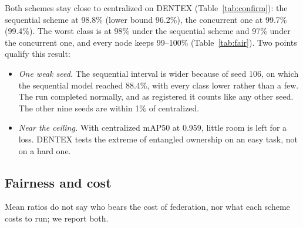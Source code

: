 \documentclass[pdflatex,sn-mathphys-num]{sn-jnl}
\begin{document}
Both schemes stay close to centralized on DENTEX (Table~\ref{tab:confirm}): the sequential scheme at 98.8\% (lower bound 96.2\%), the concurrent one at 99.7\% (99.4\%). The worst class is at 98\% under the sequential scheme and 97\% under the concurrent one, and every node keeps 99--100\% (Table~\ref{tab:fair}). Two points qualify this result:
\begin{itemize}
\item \emph{One weak seed.} The sequential interval is wider because of seed 106, on which the sequential model reached 88.4\%, with every class lower rather than a few. The run completed normally, and as registered it counts like any other seed. The other nine seeds are within 1\% of centralized.
\item \emph{Near the ceiling.} With centralized mAP50 at 0.959, little room is left for a loss. DENTEX tests the extreme of entangled ownership on an easy task, not on a hard one.
\end{itemize}

\subsection{Fairness and cost}\label{sec:res-fair}
Mean ratios do not say who bears the cost of federation, nor what each scheme costs to run; we report both.
\end{document}
